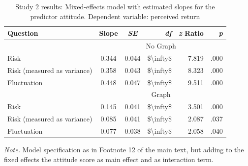 \begin{table}[H]
\begin{center}
\begin{threeparttable}
\caption{Study 2 results: Mixed-effects model with estimated slopes for the predictor attitude. Dependent variable: perceived return}
\label{sup:tab:study2_attitude_lm_trends}
\begin{tabular}{lccrrr}
\toprule
Question & Slope & \textit{SE} & \textit{df} & \textit{z} Ratio & \textit{p}\\
\midrule
& \multicolumn{5}{c}{No Graph}\\
\cmidrule{2-6}
Risk & 0.344 & 0.044 & \$\textbackslash{}infty\$ & 7.819 & .000\\
Risk (measured as variance) & 0.358 & 0.043 & \$\textbackslash{}infty\$ & 8.323 & .000\\
Fluctuation & 0.448 & 0.047 & \$\textbackslash{}infty\$ & 9.511 & .000\\
\midrule
& \multicolumn{5}{c}{Graph}\\
\cmidrule{2-6}
Risk & 0.145 & 0.041 & \$\textbackslash{}infty\$ & 3.501 & .000\\
Risk (measured as variance) & 0.085 & 0.041 & \$\textbackslash{}infty\$ & 2.087 & .037\\
Fluctuation & 0.077 & 0.038 & \$\textbackslash{}infty\$ & 2.058 & .040\\
\bottomrule
\end{tabular}
\begin{tablenotes} \small
    \textit{Note.} Model specification as in Footnote 12 of the main text, but adding to the fixed effects the attitude score as main effect and as interaction term.
\end{tablenotes}
\end{threeparttable}
\end{center}
\end{table}
